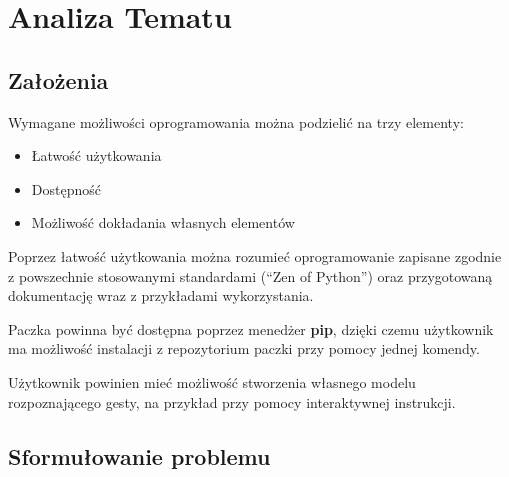 \chapter{Analiza Tematu}



\section{Założenia}

\quad Wymagane możliwości oprogramowania można podzielić na trzy elementy:

\begin{itemize}
    \item Łatwość użytkowania
    \item Dostępność
    \item Możliwość dokładania własnych elementów
\end{itemize}

\quad Poprzez łatwość użytkowania można rozumieć oprogramowanie zapisane zgodnie z powszechnie stosowanymi standardami (\enquote{Zen of Python}) oraz przygotowaną dokumentację wraz z przykładami wykorzystania.  

\quad Paczka powinna być dostępna poprzez menedżer \textbf{pip}, dzięki czemu użytkownik ma możliwość instalacji z repozytorium paczki przy pomocy jednej komendy.

\quad Użytkownik powinien mieć możliwość stworzenia własnego modelu rozpoznającego gesty, na przykład przy pomocy interaktywnej instrukcji.

\section {Sformułowanie problemu}


